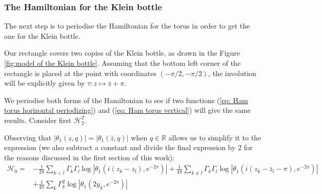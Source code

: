 \documentclass[11pt,twoside]{article}
\theoremstyle{definition}
\numberwithin{equation}{section}
\begin{document}
\subsubsection{ The Hamiltonian for the Klein bottle}
\label{sec: Ham Klein}
The next step is to periodise the Hamiltonian for the torus in order to get the one for the Klein bottle.


Our rectangle covers two copies of the Klein bottle, as drawn in the Figure \ref{fig:model of the Klein bottle}. Assuming that the bottom left corner of the rectangle is placed at the point with coordinates $(-\pi/2, -\pi/2)$, the involution will be explicitly given by $\tau:
z\mapsto\bar{z} + \pi$.

We periodise both forms of the Hamiltonian to see if two functions (\ref{eq: Ham torus horizontal periodizing}) and (\ref{eq: Ham torus vertical}) will give the same results.  Consider first $\mathcal{H}^T_2$.

Observing that $\left|\theta_1(z,q)\right| = \left|\theta_1(\bar{z},q)\right|$ when $q\in\mathbb{R}$ allows us to simplify it to the expression (we also subtract a constant and divide the final expression by 2 for the reasons discussed in the first section of this work): 
\begin{equation}
    \begin{split}
    \label{eq: Ham the wromg one}
        \mathcal{H}_0 =& -\frac{1}{2\pi}\sum_{k<l}\Gamma_k\Gamma_l\log\left|\theta_1\left(i(z_k-z_l), e^{-2\pi}\right)\right| + \frac{1}{4\pi}\sum_{k\ne l}\Gamma_k\Gamma_l\log\left|\theta_1\left(i(z_k-\bar{z}_l- \pi), e^{-2\pi}\right)\right|  \\&+\frac{1}{4\pi}\sum_k\Gamma_k^2\log\left|\theta_1\left(2y_k,e^{-2\pi}\right)\right|
    \end{split}
\end{equation}
\end{document}
